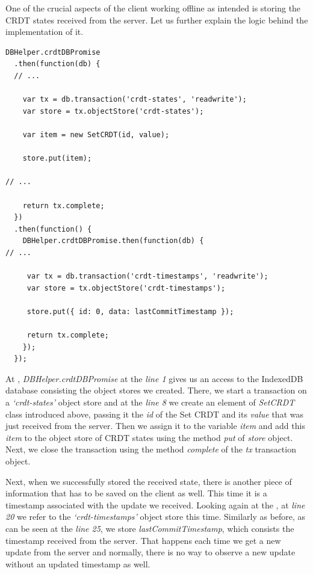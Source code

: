 One of the crucial aspects of the client working offline as intended is storing the CRDT states received from the server. Let us further explain the logic behind the implementation of it.

\begin{lstlisting}[caption={Storing CRDT states in the local database after a successful request from the server.}, label={lst:dev9}]
DBHelper.crdtDBPromise
  .then(function(db) {
  // ...

    var tx = db.transaction('crdt-states', 'readwrite');
    var store = tx.objectStore('crdt-states');

    var item = new SetCRDT(id, value);

    store.put(item);

// ...

    return tx.complete;
  })
  .then(function() {
    DBHelper.crdtDBPromise.then(function(db) {
// ...

     var tx = db.transaction('crdt-timestamps', 'readwrite');
     var store = tx.objectStore('crdt-timestamps');
     
     store.put({ id: 0, data: lastCommitTimestamp });

     return tx.complete;
    });
  });
\end{lstlisting}

At , \textit{DBHelper.crdtDBPromise} at the \textit{line 1} gives us an access to the IndexedDB database consisting the object stores we created. There, we start a transaction on a \textit{`crdt-states'} object store and at the \textit{line 8} we create an element of \textit{SetCRDT} class introduced above, passing it the \textit{id} of the Set CRDT and its \textit{value} that was just received from the server. Then we assign it to the variable \textit{item} and add this \textit{item} to the object store of CRDT states using the method \textit{put} of \textit{store} object. Next, we close the transaction using the method \textit{complete} of the \textit{tx} transaction object.

Next, when we successfully stored the received state, there is another piece of information that has to be saved on the client as well. This time it is a timestamp associated with the update we received. Looking again at the , at \textit{line 20} we refer to the \textit{`crdt-timestamps'} object store this time. Similarly as before, as can be seen at the \textit{line 25}, we store \textit{lastCommitTimestamp}, which consists the timestamp received from the server. That happens each time we get a new update from the server and normally, there is no way to observe a new update without an updated timestamp as well.


